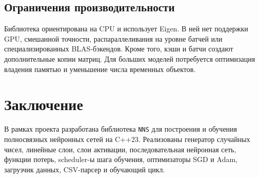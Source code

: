 \documentclass{article}
\begin{document}
\subsection{Ограничения производительности}

Библиотека ориентирована на CPU и использует Eigen. В ней нет
поддержки GPU, смешанной точности, распараллеливания на уровне батчей
или специализированных BLAS-бэкендов. Кроме того, кэши и батчи создают
дополнительные копии матриц. Для больших моделей потребуется
оптимизация владения памятью и уменьшение числа временных объектов.






\section{Заключение}

В рамках проекта разработана библиотека \texttt{NNS} для построения и
обучения полносвязных нейронных сетей на C++23. Реализованы генератор случайных чисел, линейные слои, слои активации,
последовательная нейронная сеть, функции потерь, scheduler-ы шага
обучения, оптимизаторы SGD и Adam, загрузчик данных, CSV-парсер и
обучающий цикл.
\end{document}
